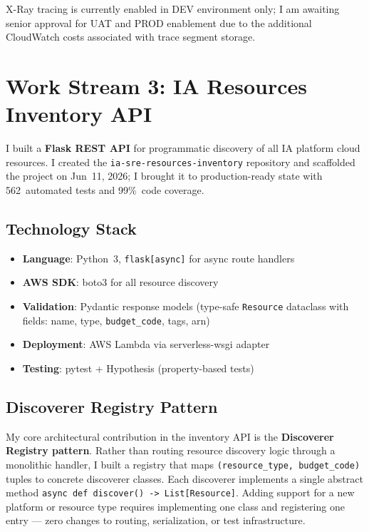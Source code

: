 X-Ray tracing is currently enabled in DEV environment only; I am awaiting senior approval for UAT and PROD enablement due to the additional CloudWatch costs associated with trace segment storage.

\FloatBarrier

\section{Work Stream 3: IA Resources Inventory API}
\label{sec:inventory_api}


I built a \textbf{Flask REST API} for programmatic discovery
of all IA platform cloud resources. I created the
\texttt{ia-sre-resources-inventory} repository and scaffolded the project on
Jun~11, 2026; I brought it to production-ready state with 562~automated
tests and 99\%~code coverage.

\subsection{Technology Stack}

\begin{itemize}
    \item \textbf{Language}: Python~3, \texttt{flask[async]} for async
          route handlers
    \item \textbf{AWS SDK}: boto3 for all resource discovery
    \item \textbf{Validation}: Pydantic response models (type-safe
          \texttt{Resource} dataclass with fields: name,
          type, \texttt{budget\_code}, tags,
          arn)
    \item \textbf{Deployment}: AWS Lambda via serverless-wsgi
          adapter
    \item \textbf{Testing}: pytest + Hypothesis
          (property-based tests)
\end{itemize}

\subsection{Discoverer Registry Pattern}

My core architectural contribution in the inventory API is the
\textbf{Discoverer Registry pattern}. Rather than routing resource
discovery logic through a monolithic handler, I built a
registry that maps \texttt{(resource\_type, budget\_code)} tuples to
concrete discoverer classes. Each discoverer implements a single abstract
method \texttt{async def discover() -> List[Resource]}. Adding support for a
new platform or resource type requires implementing one class and
registering one entry --- zero changes to routing, serialization, or
test infrastructure.

